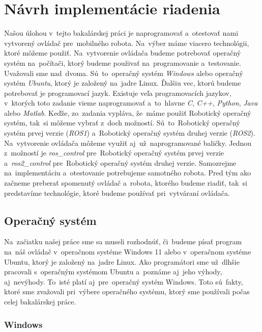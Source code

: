 \section{Návrh implementácie riadenia}
\label{sec:technologies}

Našou úlohou v~tejto bakalárskej práci je naprogramovať a~otestovať nami vytvorený ovládač pre~mobilného
robota. Na~výber máme viacero technológii, ktoré môžeme použiť. Na~vytvorenie ovládača budeme potrebovať
operačný systém na~počítači, ktorý budeme použivať na~programovanie a~testovanie. Uvažovali sme nad~dvoma.
Sú~to~operačný systém \textit{Windows} alebo operačný systém \textit{Ubuntu}, ktorý je založený
na~jadre Linux. Ďalšiu vec, ktorú budeme potrebovať je programovací jazyk. Existuje veľa programovacích jazykov,
v~ktorých toto zadanie vieme naprogramovať a~to~hlavne \textit{C}, \textit{C++}, \textit{Python},
\textit{Java} alebo \textit{Matlab}.
Keďže, zo~zadania vypláva, že~máme použiť Robotický operačný systém, tak~si môžeme vybrať z~doch možností.
Sú~to~Robotický operačný systém prvej verzie (\textit{ROS1}) a~Robotický operačný systém druhej verzie
(\textit{ROS2}). Na~vytvorenie ovládača môžeme využiť aj~už~naprogramované baličky. Jednou z~možností
je \textit{ros\_control} pre~Robotický operačný systém prvej verzie a~\textit{ros2\_control} pre~Robotický
operačný systém druhej verzie. Samozrejme na~implementáciu a~otestovanie potrebujeme samotného robota.
Pred tým ako začneme preberať spomenutý ovládač a~robota, ktorého budeme riadiť, tak~si predstavíme
technológie, ktoré budeme používať pri~vytváraní ovládača.

\subsection{Operačný systém}
\label{sec:operating_system}

Na~začiatku našej práce sme sa museli rozhodnúť, či~budeme písať program na~náš ovládač v~operačnom systéme Windows 11 alebo
v~operačnom systéme Ubuntu, ktorý je založený na~jadre Linux. Ako programátori sme už~dlhšie pracovali s~operačným systémom
Ubuntu a~poznáme aj~jeho výhody, aj~nevýhody. To~isté platí aj~pre~operačný systém Windows. Toto sú~fakty, ktoré sme zvažovali
pri~výbere operačného systému, ktorý sme používali počas celej bakalárskej práce.

\subsubsection{Windows}
\label{sec:windows}

